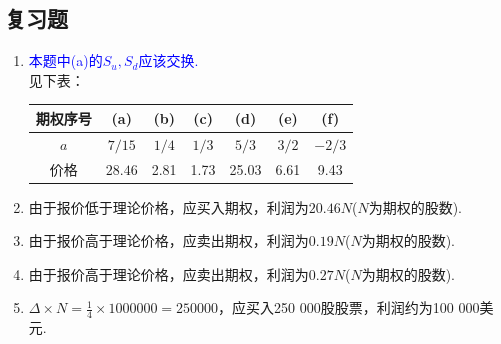 \subsection{复习题}
\begin{enumerate}
    \item \sol \textcolor{blue}{本题中(a)的$S_u,S_d$应该交换.}\\
    见下表：
    \begin{table}[H]
        \centering
        \begin{tabular}{|c|c|c|c|c|c|c|}
            \hline
            期权序号 & (a) & (b) & (c) & (d) & (e) & (f) \\ \hline
            $a$ & $7/15$ & $1/4$ & $1/3$ & $5/3$ & $3/2$ & $-2/3$ \\ \hline
            价格 & $28.46$ & 2.81 & 1.73 & 25.03 & 6.61 & 9.43 \\ \hline
        \end{tabular}
    \end{table}
    \item 由于报价低于理论价格，应买入期权，利润为$20.46N$($N$为期权的股数).
    \item 由于报价高于理论价格，应卖出期权，利润为$0.19N$($N$为期权的股数).
    \item 由于报价高于理论价格，应卖出期权，利润为$0.27N$($N$为期权的股数).
    \item $\displaystyle \Delta \times N = \frac{1}{4} \times 1 000 000 = 250 000$，应买入250 000股股票，利润约为100 000美元.
\end{enumerate}
\clearpage